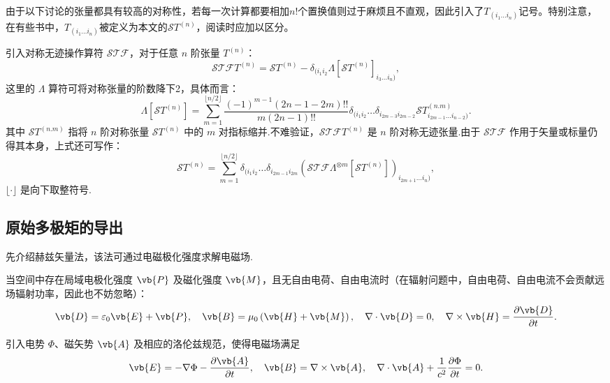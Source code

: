 由于以下讨论的张量都具有较高的对称性，若每一次计算都要相加\(n!\)个置换值则过于麻烦且不直观，因此引入了\(T_{(i_1 \dots i_n)}\)记号。特别注意，在有些书中，\(T_{(i_1 \dots i_n)}\)被定义为本文的\(\mathcal{S} T^{(n)}\)，阅读时应加以区分。

引入对称无迹操作算符 \(\mathcal{STF}\)，对于任意 \(n\) 阶张量 \(T^{(n)}\)：
\begin{equation*}
	\mathcal{STF} T^{(n)} = \mathcal{S} T^{(n)} - \delta_{(i_1 i_2} \Lambda[\mathcal{S} T^{(n)}]_{i_3 \dots i_n)},
\end{equation*}
这里的 \(\Lambda\) 算符可将对称张量的阶数降下2，具体而言：
\begin{equation*}
	\Lambda[\mathcal{S} T^{(n)}] = \sum_{m=1}^{\lfloor n/2 \rfloor} \frac{(-1)^{m-1} (2n - 1 - 2m)!!}{m (2n - 1)!!} \delta_{(i_1 i_2} \dots \delta_{i_{2m-3} i_{2m-2}} \mathcal{S} T^{(n.m)}_{i_{2m-1} \dots i_{n-2})}.
\end{equation*}
其中 \(\mathcal{S}T^{(n.m)}\) 指将 \(n\) 阶对称张量 \(\mathcal{S}T^{(n)}\) 中的 \(m\) 对指标缩并.不难验证，\(\mathcal{STF}T^{(n)}\) 是 \(n\) 阶对称无迹张量.由于 \(\mathcal{STF}\) 作用于矢量或标量仍得其本身，上式还可写作：
\begin{equation*}
	\mathcal{S}T^{(n)} = \sum_{m=1}^{\lfloor n/2 \rfloor} \delta_{(i_1 i_2} \dots \delta_{i_{2m-1} i_{2m}} \left( \mathcal{STF}\Lambda^{\otimes m}[\mathcal{S}T^{(n)}] \right)_{i_{2m+1} \dots i_n)},
\end{equation*}
\(\lfloor \cdot \rfloor\) 是向下取整符号.

\subsection{原始多极矩的导出}
先介绍赫兹矢量法，该法可通过电磁极化强度求解电磁场.

当空间中存在局域电极化强度 \(\vb{P}\) 及磁化强度 \(\vb{M}\)，且无自由电荷、自由电流时（在辐射问题中，自由电荷、自由电流不会贡献远场辐射功率，因此也不妨忽略）：
\begin{equation*}
	\vb{D} = \varepsilon_0 \vb{E} + \vb{P}, \quad \vb{B} = \mu_0 \left( \vb{H} + \vb{M} \right), \quad \nabla \cdot \vb{D} = 0, \quad \nabla \times \vb{H} = \frac{\partial \vb{D}}{\partial t}.
\end{equation*}

引入电势 \(\Phi\)、磁矢势 \(\vb{A}\) 及相应的洛伦兹规范，使得电磁场满足
\begin{equation*}
	\vb{E} = -\nabla \Phi - \frac{\partial \vb{A}}{\partial t}, \quad \vb{B} = \nabla \times \vb{A}, \quad \nabla \cdot \vb{A} + \frac{1}{c^2}\frac{\partial \Phi}{\partial t} = 0.
\end{equation*}

